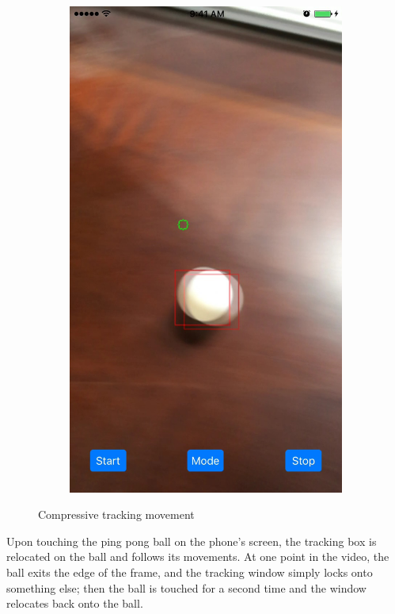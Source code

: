 \documentclass[11pt,letterpaper]{article}
\begin{document}
\begin{figure}[h!]
\begin{subfigure}{.4\textwidth}
			\includegraphics[width=1\linewidth]{touchb}
		\end{subfigure}
		\caption{Compressive tracking movement}
	\end{figure}

    Upon touching the ping pong ball on the phone's screen, the tracking box is relocated on the ball and follows its movements. At one point in the video, the ball exits the edge of the frame, and the tracking window simply locks onto something else; then the ball is touched for a second time and the window relocates back onto the ball.
	
\end{document}
